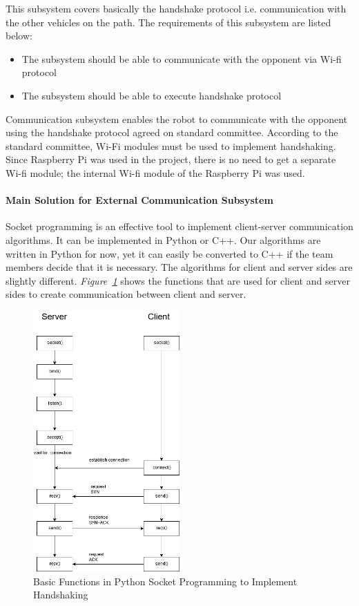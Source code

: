 \documentclass[a4paper,12pt]{article}
\begin{document}
	This subsystem covers basically the handshake protocol i.e. communication with the other vehicles on the path. The requirements of this subsystem are listed below:
	\begin{itemize}
		\item The subsystem should be able to communicate with the opponent via Wi-fi protocol
		\item The subsystem should be able to execute handshake protocol
	\end{itemize}
	
	Communication subsystem enables the robot to communicate with the opponent using the handshake protocol agreed on standard committee. According to the standard committee, Wi-Fi modules must be used to implement handshaking. Since Raspberry Pi was used in the project, there is no need to get a separate Wi-fi module; the internal Wi-fi module of the Raspberry Pi was used.
	
	\paragraph{Main Solution for External Communication Subsystem}
	
	Socket programming is an effective tool to implement client-server communication algorithms. It can be implemented in Python or C++.  Our algorithms are written in Python for now, yet it can easily be converted to C++ if the team members decide that it is necessary. The algorithms for client and server sides are slightly different. \textit{Figure~\ref{fig:socket_funcs}} shows the functions that are used for client and server sides to create communication between client and server.
	
	\begin{figure}[h]
		\center
		\setlength{\unitlength}{\textwidth} 
		\includegraphics[width=0.5\textwidth]{images/socket_funcs}
		\caption{\label{fig:socket_funcs}Basic Functions in Python Socket Programming to Implement Handshaking}
	\end{figure}
	
\end{document}
